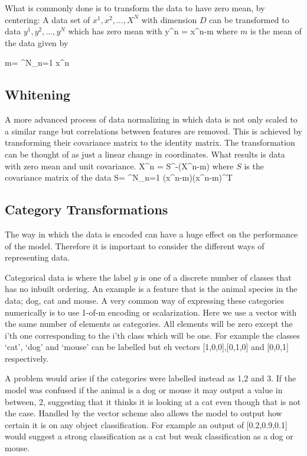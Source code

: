 What is commonly done is to transform the data to have zero mean, by centering\citep{barber2012bayesian}:
A data set of $x^1, x^2, ... , X^N$ with dimension $D$ can be transformed to data $y^1, y^2, ... , y^N$ which has zero mean with
\be
y^n = x^n-m
 \ee
where $m$ is the mean of the data given by 

 \be
m= \sum^N_{n=1} x^n
\ee




	\subsection{Whitening}

A more advanced process of data normalizing in which data is not only scaled to a similar range but correlations between features are removed.
This is achieved by transforming their covariance matrix to the identity matrix.
The transformation can be thought of as just a linear change in coordinates.
What results is data with zero mean and unit covariance.
\be
X^n = S^{-}(X^n-m)
\ee
where $S$ is the covariance matrix of the data
\be
S=  \sum^N_{n=1} (x^n-m)(x^n-m)^T
\ee

        \subsection{Category Transformations}

The way in which the data is encoded can have a huge effect on the performance of the model.
Therefore it is important to consider the different ways of representing data\citep{barber2012bayesian}.

Categorical data is where the label $y$ is one of a discrete number of classes that has no inbuilt ordering.
An example is a feature that is the animal species in the data; dog, cat and mouse.
A very common way of expressing these categories numerically is to use 1-of-m encoding or scalarization.
Here we use a vector with the same number of elements as categories.
All elements will be zero except the i'th one corresponding to the i'th class which will be one.
For example the classes `cat', `dog' and `mouse' can be labelled but eh vectors [1,0,0],[0,1,0] and [0,0,1] respectively.

A problem would arise if the categories were labelled instead as 1,2 and 3.
If the model was confused if the animal is a dog or mouse it may output a value in between, 2, suggesting that it thinks it is looking at a cat even though that is not the case.
Handled by the vector scheme also allows the model to output how certain it is on any object classification.
For example an output of [0.2,0.9,0.1] would suggest a strong classification as a cat but weak classification as a dog or mouse.

